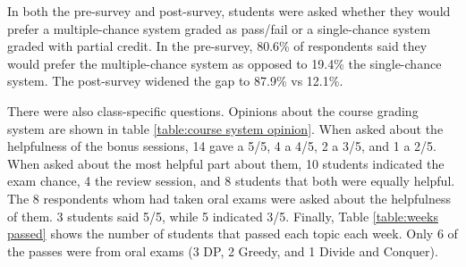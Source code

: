 \documentclass{article}
\begin{document}
In both the pre-survey and post-survey, students were asked whether they would prefer a multiple-chance system graded as pass/fail or a single-chance system graded with partial credit. In the pre-survey, 80.6\% of respondents said they would prefer the multiple-chance system as opposed to 19.4\% the single-chance system. The post-survey widened the gap to 87.9\% vs 12.1\%.

\begin{table}[h!]
\caption{Course grading system questions}
\label{table:course system opinion}
\end{table}

There were also class-specific questions. Opinions about the course grading system are shown in table \ref{table:course system opinion}. When asked about the helpfulness of the bonus sessions, 14 gave a 5/5, 4 a 4/5, 2 a 3/5, and 1 a 2/5. When asked about the most helpful part about them, 10 students indicated the exam chance, 4 the review session, and 8 students that both were equally helpful. The 8 respondents whom had taken oral exams were asked about the helpfulness of them. 3 students said 5/5, while 5 indicated 3/5. Finally, Table \ref{table:weeks passed} shows the number of students that passed each topic each week. Only 6 of the passes were from oral exams (3 DP, 2 Greedy, and 1 Divide and Conquer).
\end{document}
